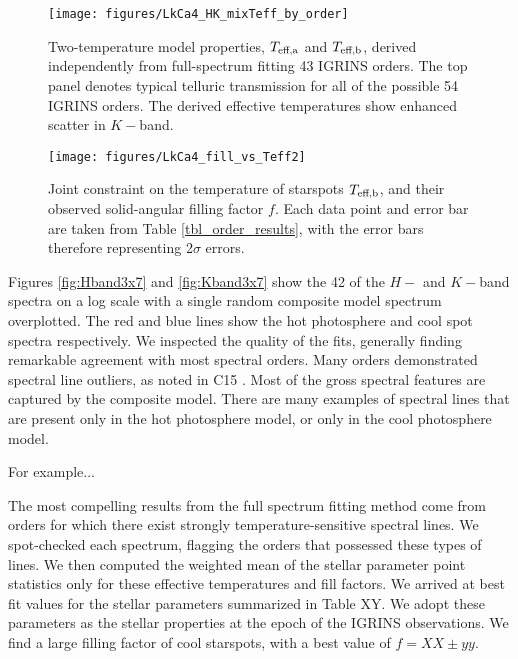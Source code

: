 \documentclass[onecolumn]{emulateapj}%
\newcommand{\iancze}{{\sc C15 }}
\begin{document}


\begin{figure*}
	\centering
	\texttt{[image: figures/LkCa4\_HK\_mixTeff\_by\_order]} 
	\caption{Two-temperature model properties, $T_\textrm{eff,a}$ and $T_\textrm{eff,b}$, derived independently from full-spectrum fitting 43 IGRINS orders.  The top panel denotes typical telluric transmission for all of the possible 54 IGRINS orders.  The derived effective temperatures show enhanced scatter in $K-$band.}
	\label{fig:TwoTempResults}
\end{figure*}



\begin{figure*}
	\centering
	\texttt{[image: figures/LkCa4\_fill\_vs\_Teff2]} 
	\caption{Joint constraint on the temperature of starspots $T_\textrm{eff,b}$, and their observed solid-angular filling factor $f$.  Each data point and error bar are taken from Table \ref{tbl_order_results}, with the error bars therefore representing 2$\sigma$ errors.}
	\label{fig:TwoTempResults}
\end{figure*}

Figures \ref{fig:Hband3x7} and \ref{fig:Kband3x7} show the 42 of the $H-$ and $K-$band spectra on a log scale with a single random composite model spectrum overplotted.  The red and blue lines show the hot photosphere and cool spot spectra respectively.  We inspected the quality of the fits, generally finding remarkable agreement with most spectral orders.  Many orders demonstrated spectral line outliers, as noted in \iancze.  Most of the gross spectral features are captured by the composite model.  There are many examples of spectral lines that are present only in the hot photosphere model, or only in the cool photosphere model.  

For example...


The most compelling results from the full spectrum fitting method come from orders for which there exist strongly temperature-sensitive spectral lines.  We spot-checked each spectrum, flagging the orders that possessed these types of lines.  We then computed the weighted mean of the stellar parameter point statistics only for these effective temperatures and fill factors.  We arrived at best fit values for the stellar parameters summarized in Table XY.  We adopt these parameters as the stellar properties at the epoch of the IGRINS observations.  We find a large filling factor of cool starspots, with a best value of $f=XX\pm yy$.
\end{document}

